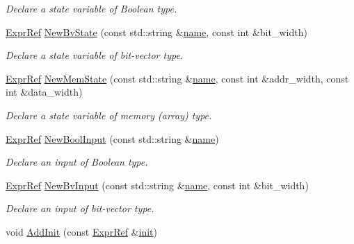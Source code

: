 \begin{DoxyCompactItemize}
\begin{DoxyCompactList}\small\item\em Declare a state variable of Boolean type. \end{DoxyCompactList}\item 
\mbox{\hyperlink{classilang_1_1_expr_ref}{Expr\+Ref}} \mbox{\hyperlink{classilang_1_1_ila_a38c75ca43e70d29087279a13c66c0e4f}{New\+Bv\+State}} (const std\+::string \&\mbox{\hyperlink{classilang_1_1_ila_aef59c0b294a99f65ce5dccef8dd1ccb7}{name}}, const int \&bit\+\_\+width)
\begin{DoxyCompactList}\small\item\em Declare a state variable of bit-\/vector type. \end{DoxyCompactList}\item 
\mbox{\hyperlink{classilang_1_1_expr_ref}{Expr\+Ref}} \mbox{\hyperlink{classilang_1_1_ila_aba2cc80796a528ec4d051b08cc968d1e}{New\+Mem\+State}} (const std\+::string \&\mbox{\hyperlink{classilang_1_1_ila_aef59c0b294a99f65ce5dccef8dd1ccb7}{name}}, const int \&addr\+\_\+width, const int \&data\+\_\+width)
\begin{DoxyCompactList}\small\item\em Declare a state variable of memory (array) type. \end{DoxyCompactList}\item 
\mbox{\hyperlink{classilang_1_1_expr_ref}{Expr\+Ref}} \mbox{\hyperlink{classilang_1_1_ila_a08e6a42c29779103ef08e87142048aec}{New\+Bool\+Input}} (const std\+::string \&\mbox{\hyperlink{classilang_1_1_ila_aef59c0b294a99f65ce5dccef8dd1ccb7}{name}})
\begin{DoxyCompactList}\small\item\em Declare an input of Boolean type. \end{DoxyCompactList}\item 
\mbox{\hyperlink{classilang_1_1_expr_ref}{Expr\+Ref}} \mbox{\hyperlink{classilang_1_1_ila_a22fa6a46415f285a85ad8a02eb55c006}{New\+Bv\+Input}} (const std\+::string \&\mbox{\hyperlink{classilang_1_1_ila_aef59c0b294a99f65ce5dccef8dd1ccb7}{name}}, const int \&bit\+\_\+width)
\begin{DoxyCompactList}\small\item\em Declare an input of bit-\/vector type. \end{DoxyCompactList}\item 
void \mbox{\hyperlink{classilang_1_1_ila_a38d066e8093e5b84b3cd26dda72a50b2}{Add\+Init}} (const \mbox{\hyperlink{classilang_1_1_expr_ref}{Expr\+Ref}} \&\mbox{\hyperlink{classilang_1_1_ila_ac1d991c75fe669b9c39c84ad1820f125}{init}})

\end{DoxyCompactItemize}
